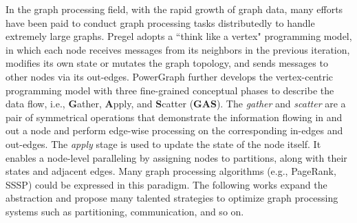 \documentclass[conference]{IEEEtran}
\begin{document}
In the graph processing field, with the rapid growth of graph data, many efforts\cite{b26,b27} have been paid to conduct graph processing tasks distributedly to handle extremely large graphs.
Pregel\cite{b22} adopts a ``think like a vertex" programming model, in which each node receives messages from its neighbors in the previous iteration, modifies its own state or mutates the graph topology, and sends messages to other nodes via its out-edges.
PowerGraph\cite{b19} further develops the vertex-centric programming model with three fine-grained conceptual phases to describe the data flow, i.e., \textbf{G}ather, \textbf{A}pply, and \textbf{S}catter (\textbf{GAS}). 
The \emph{gather} and \emph{scatter} are a pair of symmetrical operations that demonstrate the information flowing in and out a node and perform edge-wise processing on the corresponding in-edges and out-edges.
The \emph{apply} stage is used to update the state of the node itself.
It enables a node-level paralleling by assigning nodes to partitions, along with their states and adjacent edges. Many graph processing algorithms (e.g., PageRank, SSSP) could be expressed in this paradigm.
The following works\cite{b28,b29,b30,b31} expand the abstraction and propose many talented strategies to optimize graph processing systems such as partitioning, communication, and so on.



\end{document}

